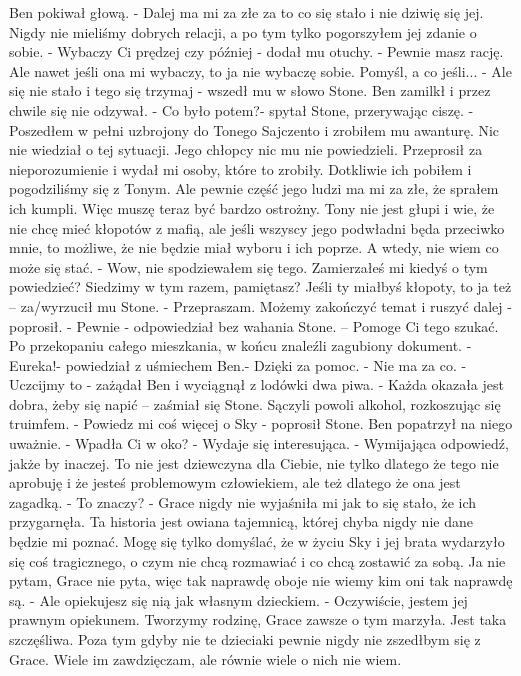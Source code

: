 \documentclass[12pt,a4paper]{book}
\begin{document}
Ben pokiwał głową. 
- Dalej ma mi za złe za to co się stało i nie dziwię się jej. Nigdy nie mieliśmy dobrych relacji, a po tym tylko pogorszyłem jej zdanie o sobie. 
- Wybaczy Ci prędzej czy później - dodał mu otuchy.
- Pewnie masz rację. Ale nawet jeśli ona mi wybaczy, to ja nie wybaczę sobie. Pomyśl, a co jeśli...
- Ale się nie stało i tego się trzymaj - wszedł mu w słowo Stone. 
Ben zamilkł i przez chwile się nie odzywał.
- Co było potem?- spytał Stone, przerywając ciszę. 
- Poszedłem w pełni uzbrojony do Tonego Sajczento i zrobiłem mu awanturę. Nic nie wiedział o tej sytuacji. Jego chłopcy nic mu nie powiedzieli. Przeprosił za nieporozumienie i wydał mi osoby, które to zrobiły. Dotkliwie ich pobiłem i pogodziliśmy się z Tonym. Ale pewnie część jego ludzi ma mi za złe, że sprałem ich kumpli. Więc muszę teraz być bardzo ostrożny. Tony nie jest głupi i wie, że nie chcę mieć kłopotów z mafią, ale jeśli wszyscy jego podwładni będa przeciwko mnie, to możliwe, że nie będzie miał wyboru i ich poprze. A wtedy, nie wiem co może się stać. 
- Wow, nie spodziewałem się tego. Zamierzałeś mi kiedyś o tym powiedzieć? Siedzimy w tym razem, pamiętasz? Jeśli ty miałbyś kłopoty, to ja też – za/wyrzucił mu Stone. 
- Przepraszam. Możemy zakończyć temat i ruszyć dalej - poprosił.
- Pewnie - odpowiedział bez wahania Stone. – Pomoge Ci tego szukać. 
Po przekopaniu całego mieszkania, w końcu znaleźli zagubiony dokument. 
- Eureka!- powiedział z uśmiechem Ben.- Dzięki za pomoc.
- Nie ma za co. 
- Uczcijmy to - zażądał Ben i wyciągnął z lodówki dwa piwa. 
- Każda okazała jest dobra, żeby się napić – zaśmiał się Stone.
Sączyli powoli alkohol, rozkoszując się truimfem. 
- Powiedz mi coś więcej o Sky - poprosił Stone. 
Ben popatrzył na niego uważnie.
- Wpadła Ci w oko?
- Wydaje się interesująca. 
- Wymijająca odpowiedź, jakże by inaczej. To nie jest dziewczyna dla Ciebie, nie tylko dlatego że tego nie aprobuję i że jesteś problemowym człowiekiem, ale też dlatego że ona jest zagadką. 
- To znaczy?
- Grace nigdy nie wyjaśniła mi jak to się stało, że ich przygarnęła. Ta historia jest owiana tajemnicą, której chyba nigdy nie dane będzie mi poznać. Mogę się tylko domyślać, że w życiu Sky i jej brata wydarzyło się coś tragicznego, o czym nie chcą rozmawiać i co chcą zostawić za sobą. Ja nie pytam, Grace nie pyta, więc tak naprawdę oboje nie wiemy kim oni tak naprawdę są. 
- Ale opiekujesz się nią jak własnym dzieckiem.
- Oczywiście, jestem jej prawnym opiekunem. Tworzymy rodzinę, Grace zawsze o tym marzyła. Jest taka szczęśliwa. Poza tym gdyby nie te dzieciaki pewnie nigdy nie zszedłbym się z Grace. Wiele im zawdzięczam, ale równie wiele o nich nie wiem. 
\end{document}

